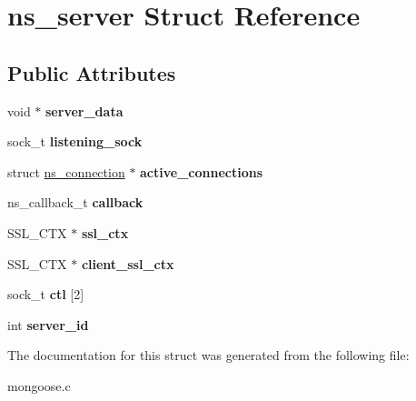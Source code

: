 \hypertarget{structns__server}{\section{ns\-\_\-server Struct Reference}
\label{structns__server}
}
\subsection*{Public Attributes}
\begin{DoxyCompactItemize}
\item 
\hypertarget{structns__server_af55726087166f7d03aeddc2ba48f2771}{void $\ast$ {\bfseries server\-\_\-data}}\label{structns__server_af55726087166f7d03aeddc2ba48f2771}

\item 
\hypertarget{structns__server_a2f7aebbeb675d926e9261b1f4cd483ec}{sock\-\_\-t {\bfseries listening\-\_\-sock}}\label{structns__server_a2f7aebbeb675d926e9261b1f4cd483ec}

\item 
\hypertarget{structns__server_aa9e4b475a57bb564fd1584584d2a884e}{struct \hyperlink{structns__connection}{ns\-\_\-connection} $\ast$ {\bfseries active\-\_\-connections}}\label{structns__server_aa9e4b475a57bb564fd1584584d2a884e}

\item 
\hypertarget{structns__server_a841af0d6bb158cd8d171ef4fefb05b71}{ns\-\_\-callback\-\_\-t {\bfseries callback}}\label{structns__server_a841af0d6bb158cd8d171ef4fefb05b71}

\item 
\hypertarget{structns__server_a78c0cc9b40b7dc65849f1978c2e52bd7}{S\-S\-L\-\_\-\-C\-T\-X $\ast$ {\bfseries ssl\-\_\-ctx}}\label{structns__server_a78c0cc9b40b7dc65849f1978c2e52bd7}

\item 
\hypertarget{structns__server_a2986e2d7c46e9f549b9f0155740b5890}{S\-S\-L\-\_\-\-C\-T\-X $\ast$ {\bfseries client\-\_\-ssl\-\_\-ctx}}\label{structns__server_a2986e2d7c46e9f549b9f0155740b5890}

\item 
\hypertarget{structns__server_a7c5be118c1ba0a6ee49ee783ce2054a3}{sock\-\_\-t {\bfseries ctl} \mbox{[}2\mbox{]}}\label{structns__server_a7c5be118c1ba0a6ee49ee783ce2054a3}

\item 
\hypertarget{structns__server_a15ea60d811c97305996918a375e26a45}{int {\bfseries server\-\_\-id}}\label{structns__server_a15ea60d811c97305996918a375e26a45}

\end{DoxyCompactItemize}


The documentation for this struct was generated from the following file\-:\begin{DoxyCompactItemize}
\item 
mongoose.\-c\end{DoxyCompactItemize}
